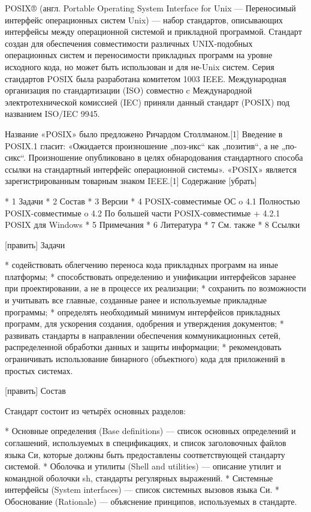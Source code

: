 POSIX® (англ. Portable Operating System Interface for Unix — Переносимый интерфейс операционных систем Unix) — набор стандартов, описывающих интерфейсы между операционной системой и прикладной программой. Стандарт создан для обеспечения совместимости различных UNIX-подобных операционных систем и переносимости прикладных программ на уровне исходного кода, но может быть использован и для не-Unix систем. Серия стандартов POSIX была разработана комитетом 1003 IEEE. Международная организация по стандартизации (ISO) совместно c Международной электротехнической комиссией (IEC) приняли данный стандарт (POSIX) под названием ISO/IEC 9945.

Название «POSIX» было предложено Ричардом Столлманом.[1] Введение в POSIX.1 гласит: «Ожидается произношение „поз-икс“ как „позитив“, а не „по-сикс“. Произношение опубликовано в целях обнародования стандартного способа ссылки на стандартный интерфейс операционной системы». «POSIX» является зарегистрированным товарным знаком IEEE.[1]
Содержание
[убрать]

    * 1 Задачи
    * 2 Состав
    * 3 Версии
    * 4 POSIX-совместимые ОС
          o 4.1 Полностью POSIX-совместимые
          o 4.2 По большей части POSIX-совместимые
                + 4.2.1 POSIX для Windows
    * 5 Примечания
    * 6 Литература
    * 7 См. также
    * 8 Ссылки

[править] Задачи

    * содействовать облегчению переноса кода прикладных программ на иные платформы;
    * способствовать определению и унификации интерфейсов заранее при проектировании, а не в процессе их реализации;
    * сохранить по возможности и учитывать все главные, созданные ранее и используемые прикладные программы;
    * определять необходимый минимум интерфейсов прикладных программ, для ускорения создания, одобрения и утверждения документов;
    * развивать стандарты в направлении обеспечения коммуникационных сетей, распределенной обработки данных и защиты информации;
    * рекомендовать ограничивать использование бинарного (объектного) кода для приложений в простых системах.

[править] Состав

Стандарт состоит из четырёх основных разделов:

    * Основные определения (Base definitions) — список основных определений и соглашений, используемых в спецификациях, и список заголовочных файлов языка Си, которые должны быть предоставлены соответствующей стандарту системой.
    * Оболочка и утилиты (Shell and utilities) — описание утилит и командной оболочки sh, стандарты регулярных выражений.
    * Системные интерфейсы (System interfaces) — список системных вызовов языка Си.
    * Обоснование (Rationale) — объяснение принципов, используемых в стандарте.


